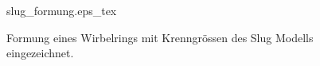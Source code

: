 \begin{figure}
\centering
\def\svgwidth{0.9\columnwidth}
{slug_formung.eps_tex}
\caption{Formung eines Wirbelrings mit Krenngrössen des Slug Modells eingezeichnet. \label{Wirbelringe:fig:slug_formung}}
\end{figure}